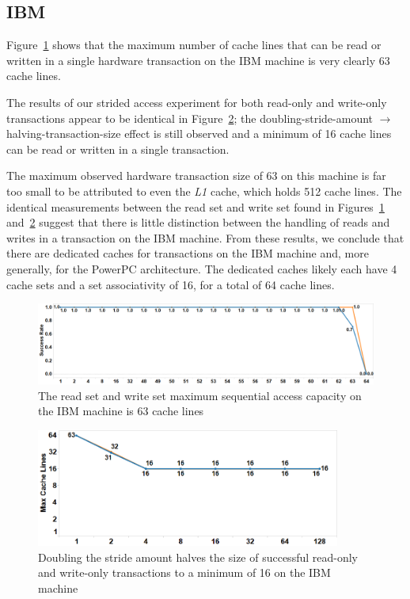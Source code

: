 \subsection*{IBM}

Figure~\ref{fig:wttm_capacity_readwrite_ibm} shows that the maximum number of
cache lines that can be read or written in a single hardware transaction on the
IBM machine is very clearly 63 cache lines.

The results of our strided access experiment for both read-only and write-only
transactions appear to be identical in
Figure~\ref{fig:wttm_stride_readwrite_ibm}; the doubling-stride-amount
$\rightarrow$ halving-transaction-size effect is still observed and a minimum of
16 cache lines can be read or written in a single transaction.

The maximum observed hardware transaction size of 63 on this machine is far too
small to be attributed to even the \textit{L1} cache, which holds 512 cache
lines. The identical measurements between the read set and write set found in
Figures~\ref{fig:wttm_capacity_readwrite_ibm}
and~\ref{fig:wttm_stride_readwrite_ibm} suggest that there is little distinction
between the handling of reads and writes in a transaction on the IBM machine.
From these results, we conclude that there are dedicated caches for transactions
on the IBM machine and, more generally, for the PowerPC architecture. The
dedicated caches likely each have 4 cache sets and a set associativity of 16,
for a total of 64 cache lines.

\begin{figure}[]%
\centering
{}
\includegraphics[width=\linewidth]{images/wttm_capacity_readwrite_ibm}
\caption{The read set and write set maximum sequential access capacity on the
IBM machine is 63 cache lines}
\label{fig:wttm_capacity_readwrite_ibm}
\end{figure}

\begin{figure}[]%
\centering
{}
\includegraphics[width=100mm]{images/wttm_stride_readwrite_ibm}
\caption{Doubling the stride amount halves the size of successful read-only and
write-only transactions to a minimum of 16 on the IBM machine}
\label{fig:wttm_stride_readwrite_ibm}
\end{figure}

